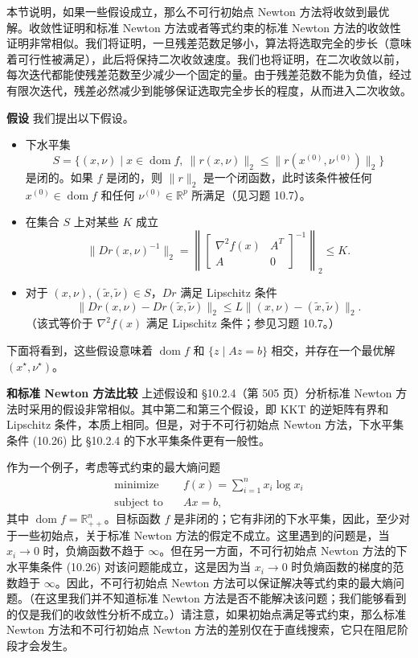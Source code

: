 \documentclass[UTF8,12pt,a4paper,fontset=fandol]{ctexart}
\begin{document}
本节说明，如果一些假设成立，那么不可行初始点 Newton 方法将收敛到最优解。收敛性证明和标准 Newton 方法或者等式约束的标准 Newton 方法的收敛性证明非常相似。我们将证明，一旦残差范数足够小，算法将选取完全的步长（意味着可行性被满足），此后将保持二次收敛速度。我们也将证明，在二次收敛以前，每次迭代都能使残差范数至少减少一个固定的量。由于残差范数不能为负值，经过有限次迭代，残差必然减少到能够保证选取完全步长的程度，从而进入二次收敛。

\noindent\textbf{假设}\quad
我们提出以下假设。

\begin{itemize}
\item 下水平集
\begin{equation}
S=\{(x,\nu)\mid x\in\operatorname{dom} f,\ \|r(x,\nu)\|_2\leq \|r(x^{(0)},\nu^{(0)})\|_2\}
\tag{10.26}
\end{equation}
是闭的。如果 $f$ 是闭的，则 $\|r\|_2$ 是一个闭函数，此时该条件被任何 $x^{(0)}\in\operatorname{dom} f$ 和任何 $\nu^{(0)}\in\mathbb{R}^p$ 所满足（见习题 10.7）。

\item 在集合 $S$ 上对某些 $K$ 成立
\begin{equation}
\|Dr(x,\nu)^{-1}\|_2
=
\left\|
\begin{bmatrix}
\nabla^2 f(x) & A^T\\
A & 0
\end{bmatrix}^{-1}
\right\|_2
\leq K.
\tag{10.27}
\end{equation}

\item 对于 $(x,\nu),(\tilde{x},\tilde{\nu})\in S$，$Dr$ 满足 Lipschitz 条件
\[
\|Dr(x,\nu)-Dr(\tilde{x},\tilde{\nu})\|_2
\leq L\|(x,\nu)-(\tilde{x},\tilde{\nu})\|_2.
\]
（该式等价于 $\nabla^2 f(x)$ 满足 Lipschitz 条件；参见习题 10.7。）
\end{itemize}

下面将看到，这些假设意味着 $\operatorname{dom} f$ 和 $\{z\mid Az=b\}$ 相交，并存在一个最优解 $(x^\star,\nu^\star)$。

\noindent\textbf{和标准 Newton 方法比较}\quad
上述假设和 \S10.2.4（第 505 页）分析标准 Newton 方法时采用的假设非常相似。其中第二和第三个假设，即 KKT 的逆矩阵有界和 Lipschitz 条件，本质上相同。但是，对于不可行初始点 Newton 方法，下水平集条件 (10.26) 比 \S10.2.4 的下水平集条件更有一般性。

作为一个例子，考虑等式约束的最大熵问题
\[
\begin{aligned}
\text{minimize}\quad & f(x)=\sum_{i=1}^n x_i\log x_i\\
\text{subject to}\quad & Ax=b,
\end{aligned}
\]
其中 $\operatorname{dom} f=\mathbb{R}_{++}^n$。目标函数 $f$ 是非闭的；它有非闭的下水平集，因此，至少对于一些初始点，关于标准 Newton 方法的假定不成立。这里遇到的问题是，当 $x_i\to 0$ 时，负熵函数不趋于 $\infty$。但在另一方面，不可行初始点 Newton 方法的下水平集条件 (10.26) 对该问题能成立，这是因为当 $x_i\to 0$ 时负熵函数的梯度的范数趋于 $\infty$。因此，不可行初始点 Newton 方法可以保证解决等式约束的最大熵问题。（在这里我们并不知道标准 Newton 方法是否不能解决该问题；我们能够看到的仅是我们的收敛性分析不成立。）请注意，如果初始点满足等式约束，那么标准 Newton 方法和不可行初始点 Newton 方法的差别仅在于直线搜索，它只在阻尼阶段才会发生。
\end{document}
